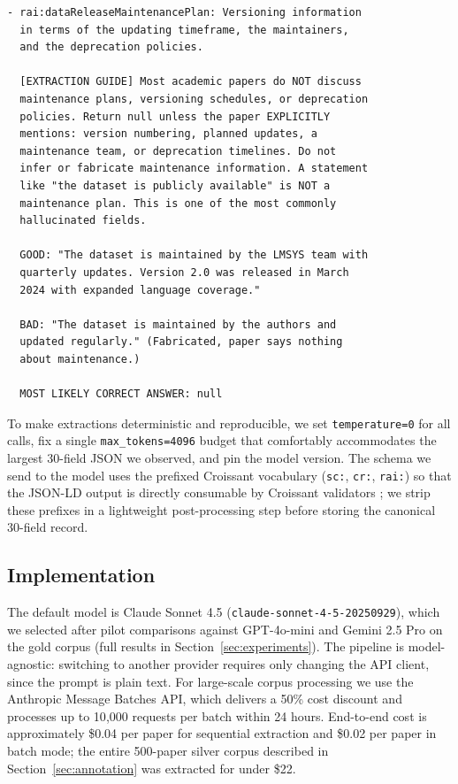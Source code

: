 \begin{lstlisting}[caption={Excerpt from the system prompt: extraction guide for the most-hallucinated RAI field. The pattern (definition, positive example, negative example, default-to-null hint) is repeated for each field where pilot studies revealed systematic confabulation.},label={lst:prompt-excerpt},basicstyle=\small\ttfamily,breaklines=true,frame=single]
- rai:dataReleaseMaintenancePlan: Versioning information
  in terms of the updating timeframe, the maintainers,
  and the deprecation policies.

  [EXTRACTION GUIDE] Most academic papers do NOT discuss
  maintenance plans, versioning schedules, or deprecation
  policies. Return null unless the paper EXPLICITLY
  mentions: version numbering, planned updates, a
  maintenance team, or deprecation timelines. Do not
  infer or fabricate maintenance information. A statement
  like "the dataset is publicly available" is NOT a
  maintenance plan. This is one of the most commonly
  hallucinated fields.

  GOOD: "The dataset is maintained by the LMSYS team with
  quarterly updates. Version 2.0 was released in March
  2024 with expanded language coverage."

  BAD: "The dataset is maintained by the authors and
  updated regularly." (Fabricated, paper says nothing
  about maintenance.)

  MOST LIKELY CORRECT ANSWER: null
\end{lstlisting}

To make extractions deterministic and reproducible, we set \texttt{temperature=0} for all calls, fix a single \texttt{max\_tokens=4096} budget that comfortably accommodates the largest 30-field JSON we observed, and pin the model version. The schema we send to the model uses the prefixed Croissant vocabulary (\texttt{sc:}, \texttt{cr:}, \texttt{rai:}) so that the JSON-LD output is directly consumable by Croissant validators \cite{akhtar2024croissant}; we strip these prefixes in a lightweight post-processing step before storing the canonical 30-field record.

\subsection{Implementation}
\label{sec:implementation}

The default model is Claude Sonnet 4.5 (\texttt{claude-sonnet-4-5-20250929}), which we selected after pilot comparisons against GPT-4o-mini and Gemini 2.5 Pro on the gold corpus (full results in Section~\ref{sec:experiments}). The pipeline is model-agnostic: switching to another provider requires only changing the API client, since the prompt is plain text. For large-scale corpus processing we use the Anthropic Message Batches API, which delivers a 50\% cost discount and processes up to 10{,}000 requests per batch within 24 hours. End-to-end cost is approximately \$0.04 per paper for sequential extraction and \$0.02 per paper in batch mode; the entire 500-paper silver corpus described in Section~\ref{sec:annotation} was extracted for under \$22.

